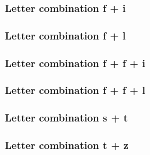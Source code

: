 \documentclass{article}
\begin{document}
\subsubsection{Letter combination f + i}
\begin{otherlanguage}{german}
\end{otherlanguage}

\subsubsection{Letter combination f + l}
\begin{otherlanguage}{german}
\end{otherlanguage}

\subsubsection{Letter combination f + f + i}
\begin{otherlanguage}{german}
\end{otherlanguage}

\subsubsection{Letter combination f + f + l}
\begin{otherlanguage}{german}
\end{otherlanguage}

\subsubsection{Letter combination s + t}
\begin{otherlanguage}{german}
\setmainfont[Ligatures=Historic]{Linux Libertine O}
\end{otherlanguage}

\subsubsection{Letter combination t + z}
\begin{otherlanguage}{german}
\setmainfont[Ligatures=Rare]{Linux Libertine O}
\end{otherlanguage}
\end{document}
